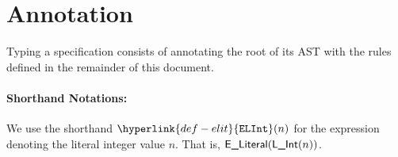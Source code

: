 \documentclass{book}
\newcommand\annotatestmt[1]{\hyperlink{def-annotatestmt}{\texttt{annotate\_stmt}}(#1)}
\newcommand\tenvone[0]{\texttt{tenv1}}
\newcommand\tenvtwo[0]{\texttt{tenv2}}
\newcommand\vs[0]{\texttt{s}}
\newcommand\vsone[0]{\texttt{s1}}
\newcommand\vstwo[0]{\texttt{s2}}
\newcommand\newsone[0]{\texttt{new\_s1}}
\newcommand\newstwo[0]{\texttt{new\_s2}}
\begin{document}

\section{Annotation}

Typing a specification consists of annotating the root of its AST with the rules defined
in the remainder of this document.


\paragraph{Shorthand Notations:}
\hypertarget{def-elit}{}
\newcommand\ELInt[1]{\hyperlink{def-elit}{\texttt{ELInt}}(#1)}
We use the shorthand $\ELInt{n}$ for the expression denoting the literal integer value $n$. That is, $\textsf{E\_Literal}(\textsf{L\_Int}(n))$.
\end{document}
